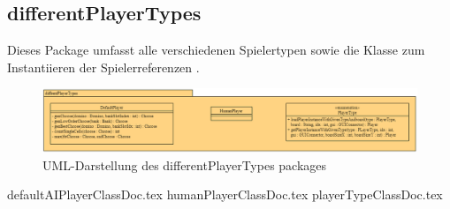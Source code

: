 \subsection{differentPlayerTypes}
\label{ss:differentPlayerTypes}
\FloatBarrier
Dieses Package umfasst alle verschiedenen Spielertypen sowie die Klasse zum Instantiieren der Spielerreferenzen . 

\begin{figure}
	\centering
	\includegraphics[width=\linewidth]{pics/differentPlayerTypesPackage}
	\caption{UML-Darstellung des differentPlayerTypes packages}
	\label{fig:differentPlayerTypesPackage}
\end{figure}

{defaultAIPlayerClassDoc.tex}
{humanPlayerClassDoc.tex}
{playerTypeClassDoc.tex}